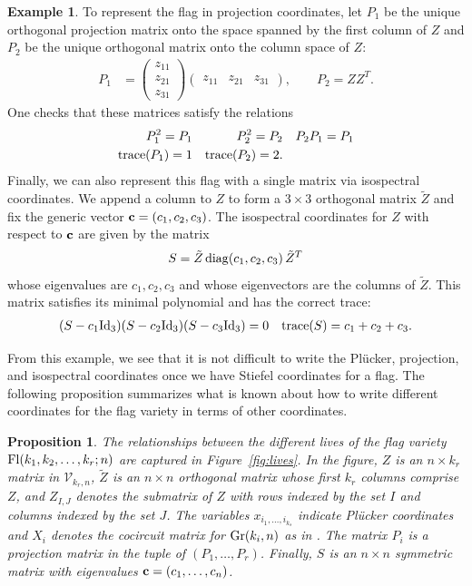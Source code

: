 \documentclass[12pt]{extarticle}
\newtheorem{proposition}[theorem]{Proposition}
\theoremstyle{definition}
\newtheorem{example}[theorem]{Example}
\numberwithin{theorem}{section}
\begin{document}
\begin{example}
    To represent the flag in projection coordinates, let $P_1$ be the unique orthogonal projection matrix onto the space spanned by the first column of $Z$ and $P_2$ be the unique orthogonal matrix onto the column space of $Z$:
    \begin{align*}
        P_1 &= 
        \begin{pmatrix}
            z_{11} \\ z_{21} \\ z_{31}
        \end{pmatrix}
        \begin{pmatrix}
            z_{11} &z_{21} & z_{31}
        \end{pmatrix}
        , \quad \quad 
        P_2 = ZZ^T.  
    \end{align*}
    One checks that these matrices satisfy the relations
    \begin{align*}
        P_1^2 = P_1 &&  P_2^2 = P_2  && P_2P_1 = P_1\\
        {\rm trace}(P_1) = 1 &&  {\rm trace}(P_2) = 2.
    \end{align*}
    Finally, we can also represent this flag with a single matrix via isospectral coordinates. 
    We append a column to $Z$ to form a $3 \times 3$ orthogonal matrix $\tilde{Z}$ and fix the generic vector ${\bf c} = (c_1,c_2,c_3)$.
    The isospectral coordinates for $Z$ with respect to $\bf c$ are given by the matrix
    \begin{align*}
        S = \tilde{Z} \, {\rm diag}(c_1, c_2, c_3)\, \tilde{Z}^T
    \end{align*}
    whose eigenvalues are  $c_1, c_2, c_3$ and whose eigenvectors are the columns of $\tilde{Z}$.
    This matrix satisfies its minimal polynomial and has the correct trace: 
    \begin{align*}
        (S - c_1{\rm Id}_3)(S - c_2{\rm Id}_3)(S - c_3{\rm Id}_3) = 0 && 
        {\rm trace}(S) = c_1 + c_2 + c_3.
    \end{align*}
\end{example}
From this example, we see that it is not difficult to write the Pl\"{u}cker, projection, and isospectral coordinates once we have Stiefel coordinates for a flag. 
The following proposition summarizes what is known about how to write different coordinates for the flag variety in terms of other coordinates.


\begin{proposition}
  The relationships between the different lives of the flag  variety ${\rm Fl}(k_1, k_2, \ldots, k_r;n)$ are captured in Figure~\ref{fig:lives}. In the figure, $Z$ is an $n \times k_r$ matrix in $\mathcal V_{k_r,n}$, $\tilde{Z}$ is an $n \times n$ orthogonal matrix whose first $k_r$ columns comprise $Z$, and $Z_{I,J}$ denotes the submatrix of $Z$ with rows indexed by the set  $I$ and columns indexed by the set $J$. The variables $x_{i_1, \dots, i_{k_s}}$ indicate Pl\"{u}cker coordinates and $X_i$ denotes the cocircuit matrix for ${\rm Gr}(k_i, n)$ as in \cite[Corollary 2.5]{DFRS}. The matrix $P_i$ is a projection matrix in the tuple of 
  $(P_1, \ldots, P_r)$. Finally, $S$
  is an $n \times n$ symmetric matrix with eigenvalues ${\bf c} = (c_1, \ldots, c_n)$.
\end{proposition}
\end{document}
